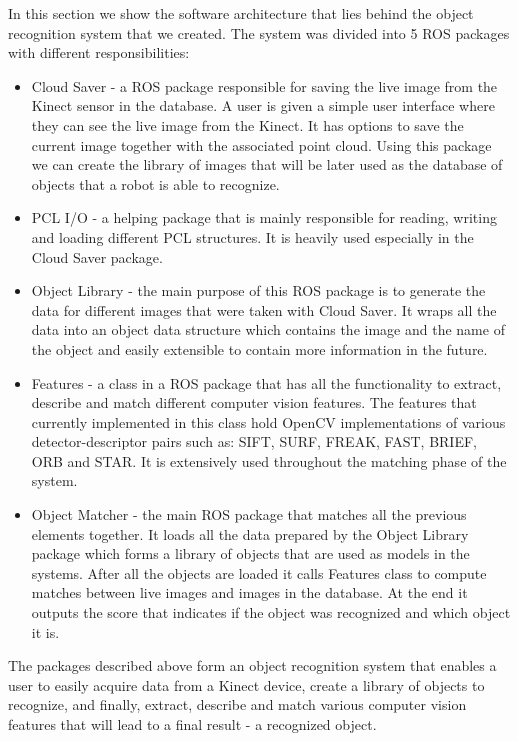 In this section we show the software architecture that lies behind the object recognition system that we created. The system was divided into 5 ROS packages with different responsibilities:
\begin{itemize}
\item Cloud Saver - a ROS package responsible for saving the live image from the Kinect sensor in the database. A user is given a simple user interface where they can see the live image from the Kinect. It has options to save the current image together with the associated point cloud. Using this package we can create the library of images that will be later used as the database of objects that a robot is able to recognize.
\item PCL I/O - a helping package that is mainly responsible for reading, writing and loading different PCL structures. It is heavily used especially in the Cloud Saver package.
\item Object Library - the main purpose of this ROS package is to generate the data for different images that were taken with Cloud Saver. It wraps all the data into an object data structure which contains the image and the name of the object and easily extensible to contain more information in the future.
\item Features - a class in a ROS package that has all the functionality to extract, describe and match different computer vision features. The features that currently implemented in this class hold OpenCV implementations of various detector-descriptor pairs such as: SIFT, SURF, FREAK, FAST, BRIEF, ORB and STAR. It is extensively used throughout the matching phase of the system.
\item Object Matcher - the main ROS package that matches all the previous elements together. It loads all the data prepared by the Object Library package which forms a library of objects that are used as models in the systems. After all the objects are loaded it calls Features class to compute matches between live images and images in the database. At the end it outputs the score that indicates if the object was recognized and which object it is.
\end{itemize}


The packages described above form an object recognition system that enables a user to easily acquire data from a Kinect device, create a library of objects to recognize, and finally, extract, describe and match various computer vision features that will lead to a final result - a recognized object.





